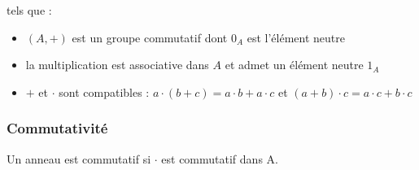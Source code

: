 \documentclass[a4paper,10pt]{book} %
\begin{document}
tels que : \\
\begin{itemize}
\item $(A,+)$ est un groupe commutatif dont $0_A$ est l'élément neutre
\item la multiplication est associative dans $A$ et admet un élément neutre $1_A$
\item $+$ et $\cdot$ sont compatibles : $a\cdot (b+c)=a\cdot b+a\cdot c$ et $(a+b)\cdot c=a\cdot c+b\cdot c$
\end{itemize}

\subsubsection{Commutativité}
Un anneau est commutatif si $\cdot$ est commutatif dans A.
\end{document}

